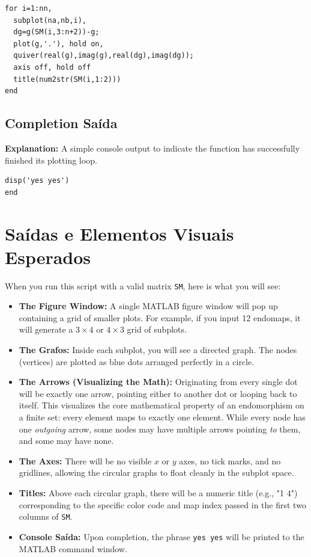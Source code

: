 \begin{lstlisting}
for i=1:nn,
  subplot(na,nb,i),
  dg=g(SM(i,3:n+2))-g;
  plot(g,'.'), hold on,
  quiver(real(g),imag(g),real(dg),imag(dg));
  axis off, hold off
  title(num2str(SM(i,1:2)))
end
\end{lstlisting}

\subsection{Completion Saída}
\textbf{Explanation:} A simple console output to indicate the function has successfully finished its plotting loop.

\begin{lstlisting}
disp('yes yes')
end
\end{lstlisting}

\section{Saídas e Elementos Visuais Esperados}

When you run this script with a valid matrix \texttt{SM}, here is what you will see:

\begin{itemize}
    \item \textbf{The Figure Window:} A single MATLAB figure window will pop up containing a grid of smaller plots. For example, if you input 12 endomaps, it will generate a $3 \times 4$ or $4 \times 3$ grid of subplots.
    \item \textbf{The Grafos:} Inside each subplot, you will see a directed graph. The nodes (vertices) are plotted as blue dots arranged perfectly in a circle.
    \item \textbf{The Arrows (Visualizing the Math):} Originating from every single dot will be exactly one arrow, pointing either to another dot or looping back to itself. This visualizes the core mathematical property of an endomorphism on a finite set: every element maps to exactly one element. While every node has one \textit{outgoing} arrow, some nodes may have multiple arrows pointing \textit{to} them, and some may have none.
    \item \textbf{The Axes:} There will be no visible $x$ or $y$ axes, no tick marks, and no gridlines, allowing the circular graphs to float cleanly in the subplot space.
    \item \textbf{Titles:} Above each circular graph, there will be a numeric title (e.g., "1 4") corresponding to the specific color code and map index passed in the first two columns of \texttt{SM}.
    \item \textbf{Console Saída:} Upon completion, the phrase \texttt{yes yes} will be printed to the MATLAB command window.
\end{itemize}
